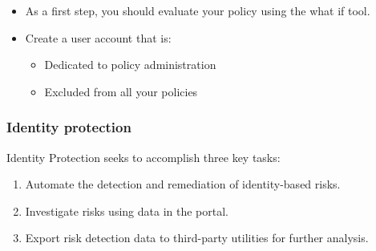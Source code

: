 \begin{itemize}
\item As a first step, you should evaluate your policy using the what if tool.
\item Create a user account that is:
	\begin{itemize}
	\item Dedicated to policy administration
	\item Excluded from all your policies
	\end{itemize}
\end{itemize}

\subsubsection{Identity protection}
Identity Protection seeks to accomplish three key tasks:
\begin{enumerate}
\item Automate the detection and remediation of identity-based risks.
\item Investigate risks using data in the portal.
\item Export risk detection data to third-party utilities for further analysis.
\end{enumerate}

